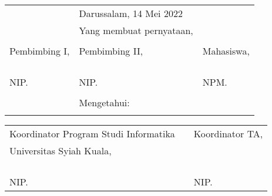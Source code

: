 \begin{singlespace}
\vspace{0.4cm}
{\renewcommand{\arraystretch}{0.8}
\centering
\begin{tabularx}{\textwidth}{llX} %
	&Darussalam, 14 Mei 2022		& \\
	&Yang membuat pernyataan,			& \\
	&&\\
	Pembimbing I,							&Pembimbing II,							&Mahasiswa,\\
	&&\\
	&&\\
	&&\\
	\underline{\pembimbingSatu}	&\underline{\pembimbingDua} &\underline{\penulis}\\
	NIP. \nipPembimbingSatu				&NIP. \nipPembimbingDua				&NPM. \npm \\
	&&\\
	&Mengetahui:\\			&
\end{tabularx}
}
{\renewcommand{\arraystretch}{0.8}
\begin{tabularx}{\textwidth}{llX} %
	Koordinator Program Studi Informatika	&\qquad\qquad  &Koordinator TA,\\
	Universitas Syiah Kuala,&\quad\quad  &\\
	&&\\
	&&\\
	&&\\
	\underline{\kaprodi}	&\quad\quad  &\underline{\koordinatorTA}\\
	NIP. \kaprodinip						&\quad\quad  &NIP. \koordinatorTAnip				
\end{tabularx}
}
\end{singlespace}